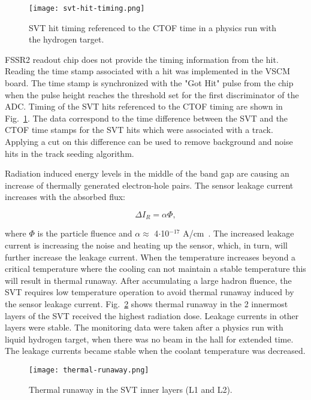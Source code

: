 \begin{figure}[htb] 
\centering 
\texttt{[image: svt-hit-timing.png]}
\caption{SVT hit timing referenced to the CTOF time in a physics run with the hydrogen target.}
\label{fig:svt-hit-timing}
\end{figure}

FSSR2 readout chip does not provide the timing information from the hit. Reading the time stamp associated with a hit was implemented in the VSCM board. The time stamp is synchronized with the "Got Hit" pulse from the chip when the pulse height reaches the threshold set for the first discriminator of the ADC. Timing of the SVT hits referenced to the CTOF timing are shown in Fig.~\ref{fig:svt-hit-timing}. The data correspond to the time difference between the SVT and the CTOF time stamps for the SVT hits which were associated with a track. Applying a cut on this difference can be  used to remove background and noise hits in the track seeding algorithm.

Radiation induced energy levels in the middle of the band gap are causing an increase of thermally generated electron-hole pairs. The sensor leakage current increases with the absorbed flux:

\begin{equation} \Delta I_R = \alpha \Phi \label{eq:leakage-fluence},
\end{equation}

where $\Phi$ is the particle fluence and $\alpha \approx$ 4$\cdot$10$^{-17}$ A/cm~\cite{DIERLAMMTHESIS}. The increased leakage current is increasing the noise and heating up the sensor, which, in turn, will further increase the leakage current. When the temperature increases beyond a critical temperature where the cooling can not maintain a stable temperature this will result in thermal runaway. After accumulating a large hadron fluence, the SVT requires low temperature operation to avoid thermal runaway induced by the sensor leakage current. Fig.~\ref{fig:thermal-runaway} shows thermal runaway in the 2 innermost layers of the SVT received the highest radiation dose. Leakage currents in other layers were stable. The monitoring data were taken after a physics run with liquid hydrogen target, when there was no beam in the hall for extended time. The leakage currents became stable when the coolant temperature was decreased.

\begin{figure}[hbt] 
\centering 
\texttt{[image: thermal-runaway.png]}
\caption{Thermal runaway in the SVT inner layers (L1 and L2).}
\label{fig:thermal-runaway}
\end{figure}

